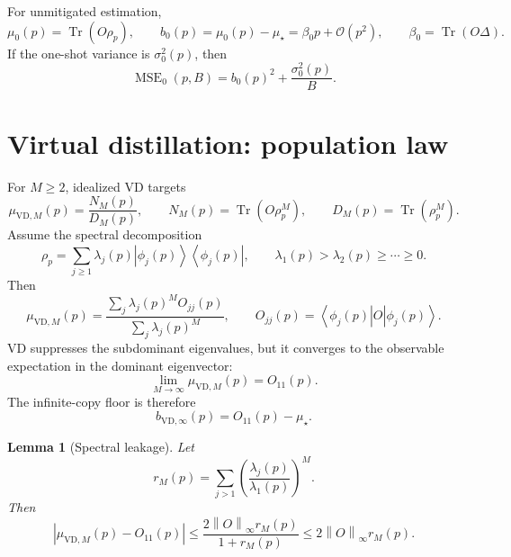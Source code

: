 \documentclass[11pt]{article}
\newtheorem{lemma}{Lemma}
\DeclareMathOperator{\Tr}{Tr}
\newcommand{\MSE}{\operatorname{MSE}}
\newcommand{\1}{\mathbf{1}}
\newcommand{\OO}{\mathcal{O}}
\newcommand{\norm}[1]{\left\lVert #1 \right\rVert}
\newcommand{\abs}[1]{\left\lvert #1 \right\rvert}
\newcommand{\bra}[1]{\left\langle #1\right|}
\newcommand{\ket}[1]{\left|#1\right\rangle}
\begin{document}
For unmitigated estimation,
\begin{equation}
    \mu_0(p)=\Tr(O\rho_p),
    \qquad
    b_0(p)=\mu_0(p)-\mu_\star=\beta_0p+\OO(p^2),
    \qquad
    \beta_0=\Tr(O\Delta).
    \label{eq:unmitigated_bias}
\end{equation}
If the one-shot variance is \(\sigma_0^2(p)\), then
\begin{equation}
    \MSE_0(p,B)=b_0(p)^2+\frac{\sigma_0^2(p)}{B}.
\end{equation}

\section{Virtual distillation: population law}

For \(M\geq2\), idealized VD targets
\begin{equation}
    \mu_{\mathrm{VD},M}(p)=\frac{N_M(p)}{D_M(p)},
    \qquad
    N_M(p)=\Tr(O\rho_p^M),
    \qquad
    D_M(p)=\Tr(\rho_p^M).
    \label{eq:vd_population_law}
\end{equation}
Assume the spectral decomposition
\begin{equation}
    \rho_p=\sum_{j\geq1}\lambda_j(p)\ket{\phi_j(p)}\bra{\phi_j(p)},
    \qquad
    \lambda_1(p)>\lambda_2(p)\geq\cdots\geq0.
\end{equation}
Then
\begin{equation}
    \mu_{\mathrm{VD},M}(p)=
    \frac{\sum_j\lambda_j(p)^M O_{jj}(p)}{\sum_j\lambda_j(p)^M},
    \qquad
    O_{jj}(p)=\bra{\phi_j(p)}O\ket{\phi_j(p)}.
\end{equation}
VD suppresses the subdominant eigenvalues, but it converges to the observable expectation in the dominant eigenvector:
\begin{equation}
    \lim_{M\to\infty}\mu_{\mathrm{VD},M}(p)=O_{11}(p).
\end{equation}
The infinite-copy floor is therefore
\begin{equation}
    b_{\mathrm{VD},\infty}(p)=O_{11}(p)-\mu_\star.
\end{equation}

\begin{lemma}[Spectral leakage]
\label{lem:spectral_leakage_v2}
Let
\begin{equation}
    r_M(p)=\sum_{j>1}\left(\frac{\lambda_j(p)}{\lambda_1(p)}\right)^M.
\end{equation}
Then
\begin{equation}
    \abs{\mu_{\mathrm{VD},M}(p)-O_{11}(p)}
    \leq \frac{2\norm{O}_\infty r_M(p)}{1+r_M(p)}
    \leq2\norm{O}_\infty r_M(p).
\end{equation}
\end{lemma}
\end{document}
